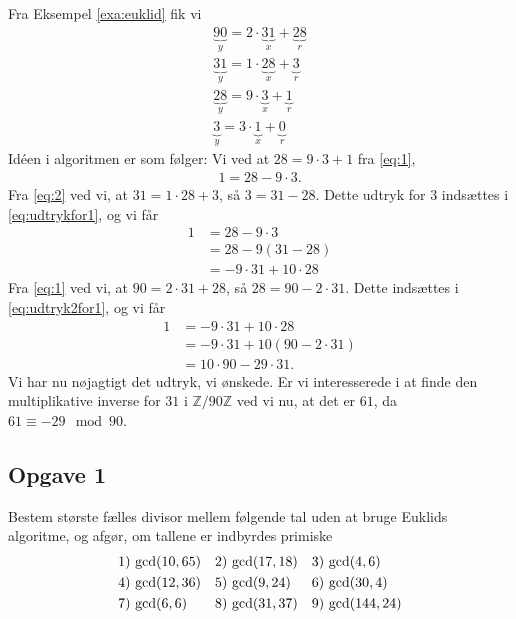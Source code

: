\begin{exa}
Fra Eksempel \ref{exa:euklid} fik vi
\begin{align}
\underbrace{90}_{y} = 2 \cdot \underbrace{31}_{x} + \underbrace{28}_{r}\label{eq:1} \\
\underbrace{31}_{y} = 1 \cdot \underbrace{28}_{x} + \underbrace{3}_{r}\label{eq:2} \\
\underbrace{28}_{y} = 9 \cdot \underbrace{3}_{x} + \underbrace{1}_{r}\label{eq:3} \\
\underbrace{3}_{y} = 3 \cdot \underbrace{1}_{x} + \underbrace{0}_{r} 
\end{align}
Idéen i algoritmen er som følger: Vi ved at $28 = 9\cdot 3 + 1$ fra \eqref{eq:1}, 
\begin{align}\label{eq:udtrykfor1}
1 = 28-9\cdot 3.
\end{align}
Fra \eqref{eq:2} ved vi, at $31 = 1\cdot 28+3$, så $3 = 31-28$. Dette udtryk for $3$ indsættes i \eqref{eq:udtrykfor1}, og vi får
\begin{align}
1 &= 28-9\cdot 3 \nonumber \\
&=28 -9(31-28) \nonumber \\
&= -9\cdot 31 + 10 \cdot 28 \label{eq:udtryk2for1}
\end{align} 
Fra \eqref{eq:1} ved vi, at $90 = 2 \cdot 31 + 28$, så $28 = 90-2\cdot 31$. Dette indsættes i \eqref{eq:udtryk2for1}, og vi får
\begin{align*}
1 &= -9\cdot 31 + 10 \cdot 28\\
  &= -9\cdot 31 + 10(90-2\cdot 31)\\
  &= 10\cdot 90 -29 \cdot 31.
\end{align*}
Vi har nu nøjagtigt det udtryk, vi ønskede. Er vi interesserede i at finde den multiplikative inverse for $31$ i $\mathbb{Z}/90\mathbb{Z}$ ved vi nu, at det er $61$, da $61 \equiv -29 \mod{90}$. 
\end{exa}

\subsection*{Opgave 1}
Bestem største fælles divisor mellem følgende tal uden at bruge Euklids algoritme, og afgør, om tallene er indbyrdes primiske
\begin{align*}
	&1) \ \textnormal{gcd}(10,65)  &&2) \ \textnormal{gcd}(17,18)  &&3) \  \textnormal{gcd}(4,6)  \\
	&4) \ \textnormal{gcd}(12,36)  &&5) \ \textnormal{gcd}(9,24)  &&6) \ \textnormal{gcd}(30,4)   \\
	&7) \ \textnormal{gcd}(6,6)  &&8) \ \textnormal{gcd}(31,37)  &&9) \  \textnormal{gcd}(144,24)  \\
\end{align*}

